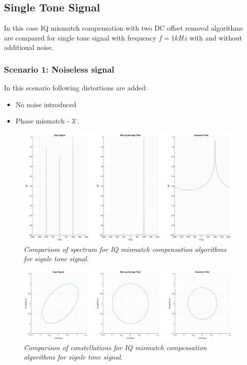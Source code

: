 \documentclass[en,printmode]{mgr}
\begin{document}
	\subsection*{Single Tone Signal}
		In this case IQ mismatch compensation with two DC offset removal algorithms are compared for
		single tone signal with frequency $f=1kHz$ with and without additional noise.
		\subsubsection*{Scenario 1: Noiseless signal}
			In this scenario following distortions are added:
			\begin{itemize}
				\item No noise introduced
				\item Phase mismatch - 3$^\circ$.
			\end{itemize}
			\begin{figure}[!htb]
    			\centering
   				\includegraphics[width=\textwidth]{plots/single_f.png}
   		 		\caption{\textit{Comparison of spectrum for IQ mismatch compensation algorithms 
   		 		for signle tone signal.}}
   		 	\end{figure}
   		 	\vspace{1cm}
   		 	\begin{figure}[H]
    			\centering
   				\includegraphics[width=\textwidth]{plots/single_c.png}
   		 		\caption{\textit{Comparison of constellations for IQ mismatch compensation algorithms 
   		 		for signle tone signal.}}
			\end{figure}
		\newpage
		\newpage
\end{document}
